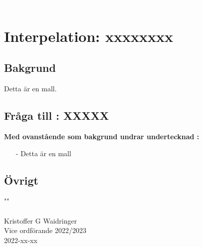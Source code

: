 \textcolor{white}{.} %



\section*{Interpelation: xxxxxxxx}
\subsection*{Bakgrund}
Detta är en mall. 
\subsection*{Fråga till : XXXXX}
\textbf{Med ovanstående som bakgrund undrar undertecknad :}
\begin{itemize}
    \item[-] Detta är en mall
     
    
\end{itemize} 




\subsection*{Övrigt}
""\\


\noindent \makebox[2.5in]{\hrulefill} \\
\noindent Kristoffer G Waidringer\\
Vice ordförande 2022/2023\\
2022-xx-xx
